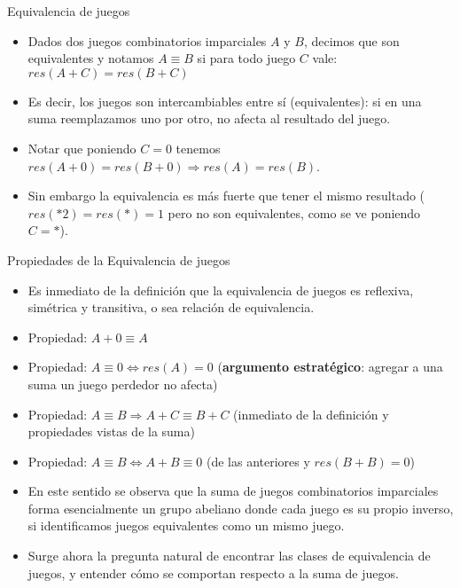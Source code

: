 \documentclass{beamer}
\begin{document}
    
\begin{frame}{Equivalencia de juegos}
    \begin{itemize}
        \item Dados dos juegos combinatorios imparciales $A$ y $B$, decimos que son equivalentes y notamos $A \equiv B$ si para todo juego $C$ vale:
        $res(A+C) = res(B+C)$
        \item Es decir, los juegos son intercambiables entre sí (equivalentes): si en una suma reemplazamos uno por otro, no
        afecta al resultado del juego.
        \item Notar que poniendo $C=0$ tenemos $res(A+0) = res(B+0) \Rightarrow res(A) = res(B)$.
        \item Sin embargo la equivalencia es más fuerte que tener el mismo resultado ($res(*2) = res(*) = 1$ pero no son equivalentes, como se ve poniendo $C = *$).
    \end{itemize}
\end{frame}

\begin{frame}{Propiedades de la Equivalencia de juegos}
    \begin{itemize}
        \item Es inmediato de la definición que la equivalencia de juegos es reflexiva, simétrica y transitiva, o sea relación de equivalencia.
        \item Propiedad: $A+0 \equiv A$
        \item Propiedad: $A \equiv 0 \Leftrightarrow res(A) = 0$ (\textbf{argumento estratégico}: agregar a una suma un juego perdedor no afecta)
        \item Propiedad: $A \equiv B \Rightarrow A+C \equiv B+C$ (inmediato de la definición y propiedades vistas de la suma)
        \item Propiedad: $A \equiv B \Leftrightarrow A + B \equiv 0$ (de las anteriores y $res(B+B) = 0$)
        \item En este sentido se observa que la suma de juegos combinatorios imparciales forma esencialmente un grupo abeliano
        donde cada juego es su propio inverso, si identificamos juegos equivalentes como un mismo juego.
        \item Surge ahora la pregunta natural de encontrar las clases de equivalencia de juegos, y entender cómo se comportan
        respecto a la suma de juegos.
    \end{itemize}
\end{frame}
\end{document}
